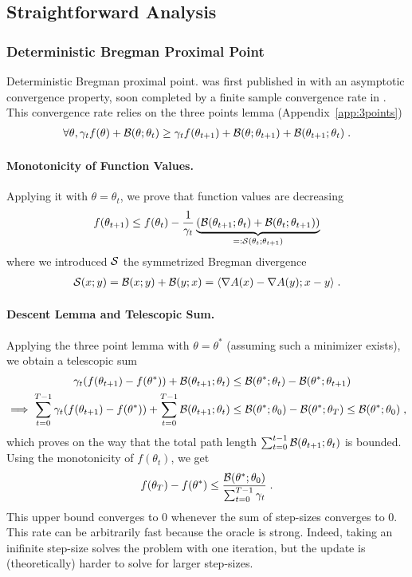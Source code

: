 \documentclass{article}
\newcommand{\nat}{\theta}
\newcommand{\lr}{\gamma} %
\begin{document}
\subsection{Straightforward Analysis}

\subsubsection{Deterministic Bregman Proximal Point}
Deterministic Bregman proximal point. was first published in \citet{eckstein1993nonlinear} with an asymptotic convergence property, soon completed by a finite sample convergence rate in \citet{chen1993convergence}. 
This convergence rate relies on the three points lemma (Appendix~\ref{app:3points})
\begin{align}
	 \forall \nat, \lr_t f(\nat) + \cB(\nat ; \nat_t) \geq \lr_t f(\nat_{t+1}) + \cB( \nat; \nat_{t+1}) +\cB(\nat_{t+1} ; \nat_{t}) \; .
\end{align}

\paragraph{Monotonicity of Function Values.}
Applying it with $\nat=\nat_t$, we prove that function values are decreasing
\begin{align}
	f(\nat_{t+1})  \leq f(\nat_{t})  - \inv{\lr_t} \underbrace{\left (\cB(\nat_{t+1} ; \nat_{t}) + \cB(\nat_{t} ; \nat_{t+1}) \right) }_{=: \cS(\nat_{t} ; \nat_{t+1})}
\end{align}
where we introduced ${\mathcal S}$ the symmetrized Bregman divergence
\begin{align}
	{\mathcal S}(x; y) = {\mathcal B}(x ; y) + {\mathcal B}(y ; x) = \langle\nabla A(x) - \nabla A(y) ; x-y \rangle \; .
\end{align}

\paragraph{Descent Lemma and Telescopic Sum.}
Applying the three point lemma with $\nat=\nat^*$ (assuming such a minimizer exists), we obtain a telescopic sum
\begin{align}
	\lr_t(f(\nat_{t+1}) - f(\nat^*)) +  \cB(\nat_{t+1} ; \nat_{t}) 
	&\leq  \cB( \nat^*; \nat_{t})  - \cB( \nat^*; \nat_{t+1}) \\
	\implies \sum_{t=0}^{T-1} \lr_t (f(\nat_{t+1}) - f(\nat^*)) 
	+ \sum_{t=0}^{T-1} \cB(\nat_{t+1} ; \nat_{t}) 
	&\leq \cB( \nat^*; \nat_{0})  - \cB( \nat^*; \nat_{T})  
	\leq \cB( \nat^*; \nat_{0})  \; ,
\end{align}
which proves on the way that the total path length $ \sum_{t=0}^{t-1} \cB(\nat_{t+1} ; \nat_{t}) $ is bounded.
Using the monotonicity of $f(\nat_t)$, we get
\begin{align}
	f(\nat_{T}) - f(\nat^*) \leq \frac{\cB( \nat^*; \nat_{0}) }{\sum_{t=0}^{T-1} \lr_t} \; .
\end{align}
This upper bound converges to $0$ whenever the sum of step-sizes converges to $0$. 
This rate can be arbitrarily fast because the oracle is strong. Indeed, taking an inifinite step-size solves the problem with one iteration, but the update is (theoretically) harder to solve for larger step-sizes.
\end{document}
